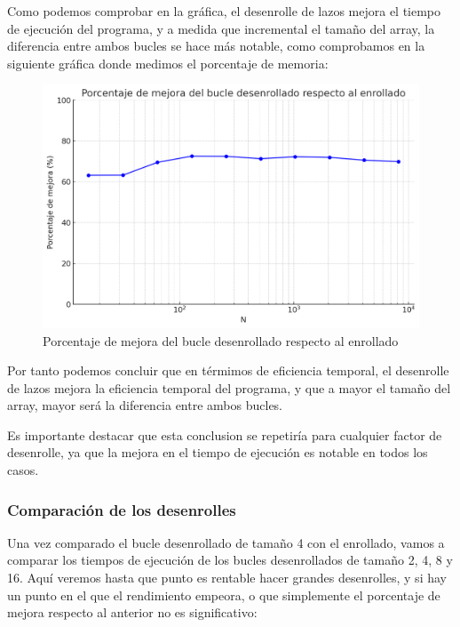 \documentclass[a4paper,twocolumn]{article}
\begin{document}
Como podemos comprobar en la gráfica, el desenrolle de lazos mejora el tiempo de ejecución del programa, y a medida que incremental el tamaño del array, la diferencia entre ambos bucles se hace más notable, como comprobamos en la siguiente gráfica donde medimos el porcentaje de memoria:

\begin{figure}[H]
	\centering
	\includegraphics[width=\columnwidth]{img/4Histograma.png}
	\caption{Porcentaje de mejora del bucle desenrollado respecto al enrollado}
	\label{fig:times}
\end{figure}

Por tanto podemos concluir que en térmimos de eficiencia temporal, el desenrolle de lazos mejora la eficiencia temporal del programa, y que a mayor el tamaño del array, mayor será la diferencia entre ambos bucles.

Es importante destacar que esta conclusion se repetiría para cualquier factor de desenrolle, ya que la mejora en el tiempo de ejecución es notable en todos los casos.

\subsubsection{Comparación de los desenrolles}

Una vez comparado el bucle desenrollado de tamaño 4 con el enrollado, vamos a comparar los tiempos de ejecución de los bucles desenrollados de tamaño 2, 4, 8 y 16. Aquí veremos hasta que punto es rentable hacer grandes desenrolles, y si hay un punto en el que el rendimiento empeora, o que simplemente el porcentaje de mejora respecto al anterior no es significativo:
\end{document}
